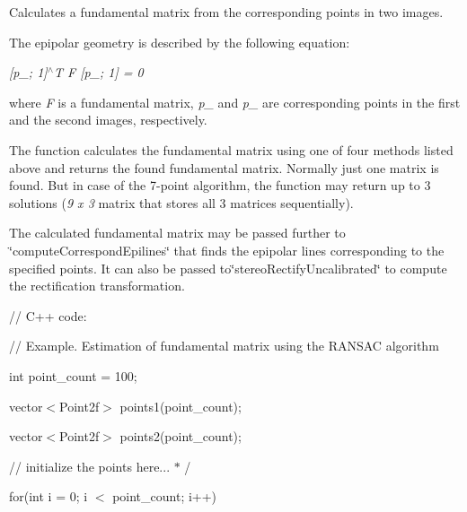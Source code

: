 Calculates a fundamental matrix from the corresponding points in two images.

The epipolar geometry is described by the following equation\+:

{\itshape \mbox{[}p\+\_; 1\mbox{]}$^\wedge$T F \mbox{[}p\+\_; 1\mbox{]} = 0}

where {\itshape F} is a fundamental matrix, {\itshape p\+\_} and {\itshape p\+\_} are corresponding points in the first and the second images, respectively.

The function calculates the fundamental matrix using one of four methods listed above and returns the found fundamental matrix. Normally just one matrix is found. But in case of the 7-\/point algorithm, the function may return up to 3 solutions ({\itshape 9 x 3} matrix that stores all 3 matrices sequentially).

The calculated fundamental matrix may be passed further to \char`\"{}compute\+Correspond\+Epilines\char`\"{} that finds the epipolar lines corresponding to the specified points. It can also be passed to\char`\"{}stereo\+Rectify\+Uncalibrated\char`\"{} to compute the rectification transformation. {\ttfamily }

{\ttfamily }

{\ttfamily }

{\ttfamily // C++ code\+:}

{\ttfamily }

{\ttfamily }

{\ttfamily // Example. Estimation of fundamental matrix using the R\+A\+N\+S\+AC algorithm}

{\ttfamily }

{\ttfamily }

{\ttfamily int point\+\_\+count = 100;}

{\ttfamily }

{\ttfamily }

{\ttfamily vector$<$\+Point2f$>$ points1(point\+\_\+count);}

{\ttfamily }

{\ttfamily }

{\ttfamily vector$<$\+Point2f$>$ points2(point\+\_\+count);}

{\ttfamily }

{\ttfamily }

{\ttfamily // initialize the points here... $\ast$ /}

{\ttfamily }

{\ttfamily }

{\ttfamily for(int i = 0; i $<$ point\+\_\+count; i++)}

